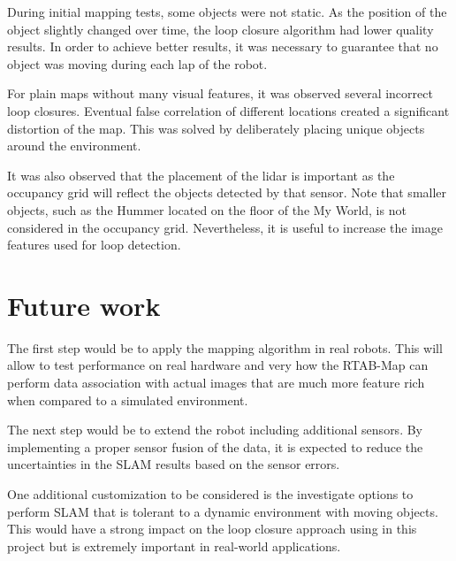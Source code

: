 \documentclass[10pt,journal,compsoc]{IEEEtran}
\begin{document}
During initial mapping tests, some objects were not static. As the position of the object slightly changed over time, the loop closure algorithm had lower quality results. In order to achieve better results, it was necessary to guarantee that no object was moving during each lap of the robot. 

For plain maps without many visual features, it was observed several incorrect loop closures. Eventual false correlation of different locations created a significant distortion of the map. This was solved by deliberately placing unique objects around the environment. 

It was also observed that the placement of the lidar is important as the occupancy grid will reflect the objects detected by that sensor. Note that smaller objects, such as the Hummer located on the floor of the My World, is not considered in the occupancy grid. Nevertheless, it is useful to increase the image features used for loop detection.



\section{Future work}

The first step would be to apply the mapping algorithm in real robots. This will allow to test performance on real hardware and very how the RTAB-Map can perform data association with actual images that are much more feature rich when compared to a simulated environment.

The next step would be to extend the robot including additional sensors. By implementing a proper sensor fusion of the data, it is expected to reduce the uncertainties in the SLAM results based on the sensor errors. 

One additional customization to be considered is the investigate options to perform SLAM that is tolerant to a dynamic environment with moving objects. This would have a strong impact on the loop closure approach using in this project but is extremely important in real-world applications.

%
%
\end{document}
